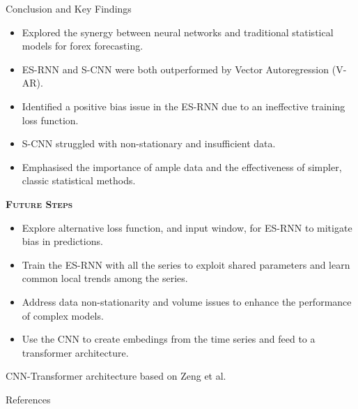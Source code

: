 \documentclass[aspectratio=169, 12pt]{beamer}
\begin{document}
\begin{frame}[allowframebreaks]{Conclusion and Key Findings}
        \begin{itemize}
            \item Explored the synergy between neural networks and traditional statistical models for forex forecasting.
            \item ES-RNN and S-CNN were both outperformed by Vector Autoregression (V-AR).
            \item Identified a positive bias issue in the ES-RNN due to an ineffective training loss function.
            \item S-CNN struggled with non-stationary and insufficient data.
            \item Emphasised the importance of ample data and the effectiveness of simpler, classic statistical methods.
        \end{itemize}
    \newpage
    \begin{center}
        \textsc{\textbf{Future Steps}}
    \end{center}
        \begin{itemize}
            \item Explore alternative loss function, and input window, for ES-RNN to mitigate bias in predictions.
            \item Train the ES-RNN with all the series to exploit shared parameters and learn common local trends among the series.
            \item Address data non-stationarity and volume issues to enhance the performance of complex models.
            \item Use the CNN to create embedings from the time series and feed to a transformer architecture.
        \end{itemize}
CNN-Transformer architecture based on Zeng et al. \cite{transformer}
\begin{figure}[htbp]
\centering
\def\svgwidth{0.55\columnwidth}

\end{figure}
\end{frame}

\begin{frame}[allowframebreaks]{References}

  
  

\end{frame}
\end{document}
